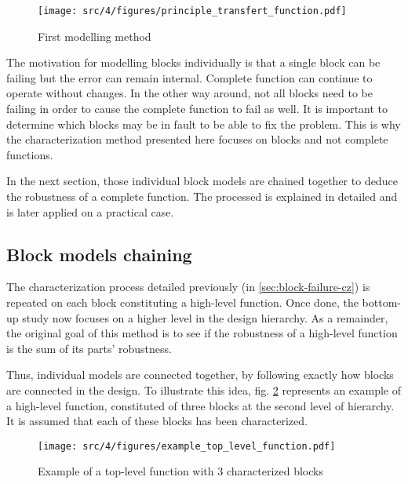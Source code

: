 \begin{figure}[!h]
  \centering
  \texttt{[image: src/4/figures/principle\_transfert\_function.pdf]}
  \caption{First modelling method}
  \label{fig:principle-transfert-func}
\end{figure}

The motivation for modelling blocks individually is that a single block can be failing but the error can remain internal.
Complete function can continue to operate without changes.
In the other way around, not all blocks need to be failing in order to cause the complete function to fail as well.
It is important to determine which blocks may be in fault to be able to fix the problem.
This is why the characterization method presented here focuses on blocks and not complete functions.

In the next section, those individual block models are chained together to deduce the robustness of a complete function.
The processed is explained in detailed and is later applied on a practical case.

\subsection{Block models chaining}
\label{sec:block-chaining}

The characterization process detailed previously (in \ref{sec:block-failure-cz}) is repeated on each block constituting a high-level function.
Once done, the bottom-up study now focuses on a higher level in the design hierarchy.
As a remainder, the original goal of this method is to see if the robustness of a high-level function is the sum of its parts' robustness.

Thus, individual models are connected together, by following exactly how blocks are connected in the design.
To illustrate this idea, fig. \ref{example_toplevel_function} represents an example of a high-level function, constituted of three blocks at the second level of hierarchy.
It is assumed that each of these blocks has been characterized.


\begin{figure}[!h]
  \centering
  \texttt{[image: src/4/figures/example\_top\_level\_function.pdf]}
  \caption{Example of a top-level function with 3 characterized blocks}
  \label{example_toplevel_function}
\end{figure}

